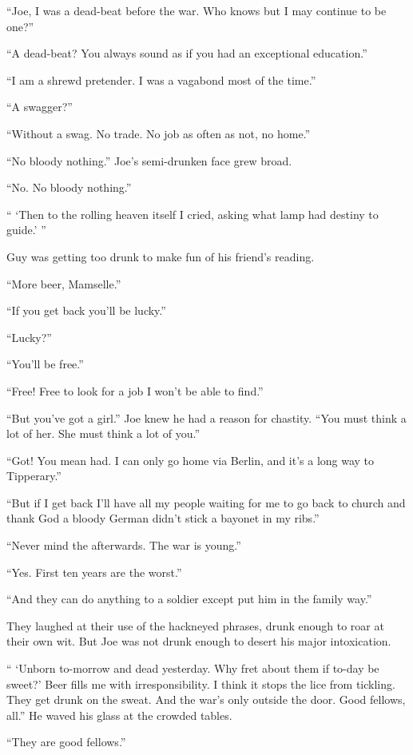 ``Joe, I was a dead-beat before the war. Who knows but I may continue to be one?''

``A dead-beat? You always sound as if you had an exceptional education.''

``I am a shrewd pretender. I was a vagabond most of the time.''

``A swagger?''

``Without a swag. No trade. No job as often as not, no home.''

``No bloody nothing.'' Joe's semi-drunken face grew broad.

``No. No bloody nothing.''

`` `Then to the rolling heaven itself I cried, asking what lamp had destiny to guide.' ''

Guy was getting too drunk to make fun of his friend's reading.

``More beer, Mamselle.''

``If you get back you'll be lucky.''

``Lucky?''

``You'll be free.''

``Free! Free to look for a job I won't be able to find.''

``But you've got a girl.'' Joe knew he had a reason for chastity. ``You must think a lot of her. She must think a lot of you.''

``Got! You mean had. I can only go home via Berlin, and it's a long way to Tipperary.''

``But if I get back I'll have all my people waiting for me to go back to church and thank God a bloody German didn't stick a bayonet in my ribs.''

``Never mind the afterwards. The war is young.''

``Yes. First ten years are the worst.''

``And they can do anything to a soldier except put him in the family way.''

They laughed at their use of the hackneyed phrases, drunk enough to roar at their own wit. But Joe was not drunk enough to desert his major intoxication.

`` `Unborn to-morrow and dead yesterday. Why fret about them if to-day be sweet?' Beer fills me with irresponsibility. I think it stops the lice from tickling. They get drunk on the sweat. And the war's only outside the door. Good fellows, all.'' He waved his glass at the crowded tables.

``They are good fellows.''

